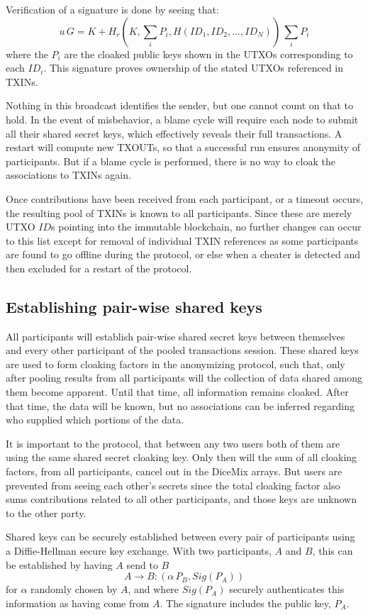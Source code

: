 \documentclass[8pt,fleqn,openany]{book}
\begin{document}
Verification of a signature is done by seeing that:
$$u \, G = K + H_r(K, \sum_i{P_i}, H(ID_1, ID_2, ..., ID_N)) \, \sum_i{P_i}$$
where the $P_i$ are the cloaked public keys shown in the UTXOs corresponding to each $ID_i$. This signature proves ownership of the stated UTXOs referenced in TXINs.

Nothing in this broadcast identifies the sender, but one cannot count on that to hold. In the event of misbehavior, a blame cycle will require each node to submit all their shared secret keys, which effectively reveals their full transactions. A restart will compute new TXOUTs, so that a successful run ensures anonymity of participants. But if a blame cycle is performed, there is no way to cloak the associations to TXINs again.

Once contributions have been received from each participant, or a timeout occurs, the resulting pool of TXINs is known to all participants. Since these are merely UTXO $ID$s pointing into the immutable blockchain, no further changes can occur to this list except for removal of individual TXIN references as some participants are found to go offline during the protocol, or else when a cheater is detected and then excluded for a restart of the protocol.

\subsection{Establishing pair-wise shared keys} 
All participants will establish pair-wise shared secret keys between themselves and every other participant of the pooled transactions session. These shared keys are used to form cloaking factors in the anonymizing protocol, such that, only after pooling results from all participants will the collection of data shared among them become apparent. Until that time, all information remains cloaked. After that time, the data will be known, but no associations can be inferred regarding who supplied which portions of the data. 

It is important to the protocol, that between any two users both of them are using the same shared secret cloaking key. Only then will the sum of all cloaking factors, from all participants, cancel out in the DiceMix arrays. But users are prevented from seeing each other’s secrets since the total cloaking factor also sums contributions related to all other participants, and those keys are unknown to the other party.

Shared keys can be securely established between every pair of participants using a Diffie-Hellman secure key exchange\cite{c21}. With two participants, $A$ and $B$, this can be established by having $A$ send to $B$
$$A \rightarrow B: (\alpha \, P_B, Sig(P_A))$$
for $\alpha$ randomly chosen by $A$, and where $Sig(P_A)$ securely authenticates this information as having come from $A$. The signature includes the public key, $P_A$. 
\end{document}
